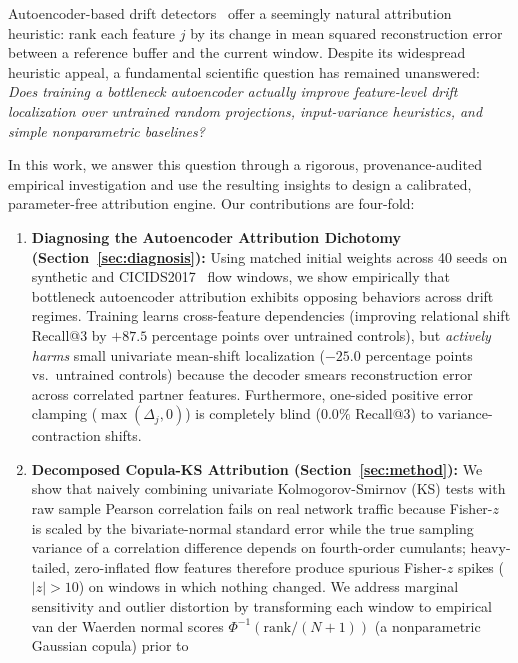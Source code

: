 \documentclass[10pt,conference]{IEEEtran}
\begin{document}
Autoencoder-based drift detectors~\cite{sakurada2014anomaly,komorniczak2026owadd}
offer a seemingly natural attribution heuristic: rank each feature $j$ by its
change in mean squared reconstruction error between a reference buffer and the
current window. Despite its widespread heuristic appeal, a fundamental
scientific question has remained unanswered: \emph{Does training a bottleneck
autoencoder actually improve feature-level drift localization over untrained
random projections, input-variance heuristics, and simple nonparametric baselines?}

In this work, we answer this question through a rigorous, provenance-audited
empirical investigation and use the resulting insights to design a calibrated,
parameter-free attribution engine. Our contributions are four-fold:
\begin{enumerate}
  \item \textbf{Diagnosing the Autoencoder Attribution Dichotomy
        (Section~\ref{sec:diagnosis}):} Using matched initial weights across 40
        seeds on synthetic and CICIDS2017~\cite{sharafaldin2018cicids} flow
        windows, we show empirically that bottleneck autoencoder attribution exhibits
        opposing behaviors across drift regimes. Training learns cross-feature
        dependencies (improving relational shift Recall@3 by $+87.5$ percentage
        points over untrained controls), but \emph{actively harms} small
        univariate mean-shift localization ($-25.0$ percentage points vs.\
        untrained controls) because the decoder smears reconstruction error
        across correlated partner features. Furthermore, one-sided positive
        error clamping ($\max(\Delta_j, 0)$) is completely blind ($0.0\%$
        Recall@3) to variance-contraction shifts.
  \item \textbf{Decomposed Copula-KS Attribution (Section~\ref{sec:method}):}
        We show that naively combining univariate Kolmogorov-Smirnov (KS) tests
        with raw sample Pearson correlation fails on real network traffic
        because Fisher-$z$ is scaled by the bivariate-normal standard error while
        the true sampling variance of a correlation difference depends on fourth-order
        cumulants; heavy-tailed, zero-inflated flow features therefore produce
        spurious Fisher-$z$ spikes ($|z| > 10$) on windows in which nothing changed.
        We address marginal sensitivity and outlier distortion by transforming each
        window to empirical van der Waerden normal scores
        $\Phi^{-1}(\mathrm{rank}/(N+1))$ (a nonparametric Gaussian copula) prior to

\end{enumerate}
\end{document}
